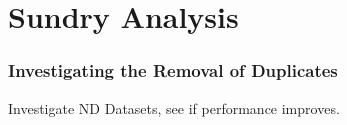 \section{Sundry Analysis} %
\label{sec:sundry_analysis}


\subsubsection{Investigating the Removal of Duplicates} %
\label{ssub:investigating_the_removal_of_duplicates}

Investigate ND Datasets, see if performance improves.

